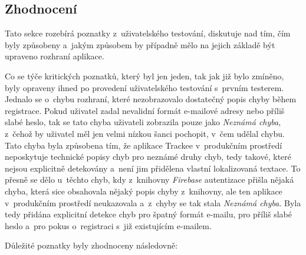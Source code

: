 \subsection{Zhodnocení}

Tato sekce rozebírá poznatky z~uživatelského testování, diskutuje nad tím, čím byly způsobeny a~jakým způsobem by případně mělo na jejich základě být upraveno rozhraní aplikace.

Co se týče kritických poznatků, který byl jen jeden, tak jak již bylo zmíněno, byly opraveny ihned po provedení uživatelského testování s~prvním testerem. Jednalo se o~chybu rozhraní, které nezobrazovalo dostatečný popis chyby během registrace. Pokud uživatel zadal nevalidní formát e-mailové adresy nebo příliš slabé heslo, tak se tato chyba uživateli zobrazila pouze jako \emph{Neznámá chyba}, z~čehož by uživatel měl jen velmi nízkou šanci pochopit, v~čem udělal chybu. Tato chyba byla způsobena tím, že aplikace Trackee v~produkčním prostředí neposkytuje technické popisy chyb pro neznámé druhy chyb, tedy takové, které nejsou explicitně detekovány a~není jim přidělena vlastní lokalizovaná textace. To přesně se dělo u~těchto chyb, kdy z~knihovny \emph{Firebase} autentizace přišla nějaká chyba, která sice obsahovala nějaký popis chyby z~knihovny, ale ten aplikace v~produkčním prostředí neukazovala a~z~chyby se tak stala \emph{Neznámá chyba}. Byla tedy přidána explicitní detekce chyb pro špatný formát e-mailu, pro příliš slabé heslo a~pro pokus o~registraci s~již existujícím e-mailem.

Důležité poznatky byly zhodnoceny následovně:

